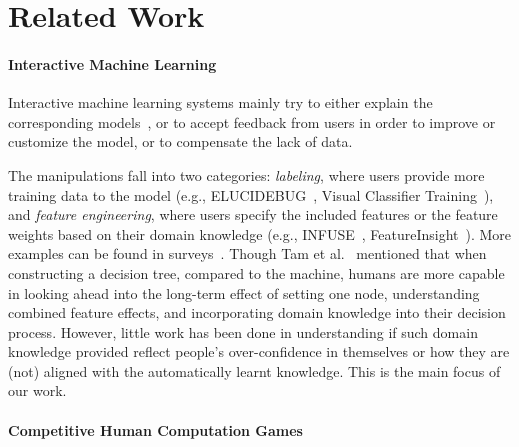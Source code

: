
\section{Related Work}


\paragraph{Interactive Machine Learning}
Interactive machine learning systems mainly try to either explain the corresponding models~\cite{ren2017squares, alsallakh2014visual}, or to accept feedback from users in order to improve or customize the model, or to compensate the lack of data.

The manipulations fall into two categories: 
\emph{labeling}, where users provide more training data to the model (e.g., ELUCIDEBUG~\cite{kulesza2015principles}, Visual Classifier Training~\cite{heimerl2012visual}), and \emph{feature engineering}, where users specify the included features or the feature weights based on their domain knowledge (e.g., INFUSE~\cite{krause2014infuse}, FeatureInsight~\cite{brooks2015featureinsight}).
More examples can be found in surveys~\cite{Brown2016HumanMachineLearnerIT}. 
Though Tam et al.~\cite{tam2017analysis} mentioned that when constructing a decision tree, compared to the machine, humans are more capable in looking ahead into the long-term effect of setting one node, understanding combined feature effects, and incorporating domain knowledge into their decision process.
However, little work has been done in understanding if such domain knowledge provided reflect people's over-confidence in themselves or how they are (not) aligned with the automatically learnt knowledge. 
This is the main focus of our work.

\paragraph{Competitive Human Computation Games}
